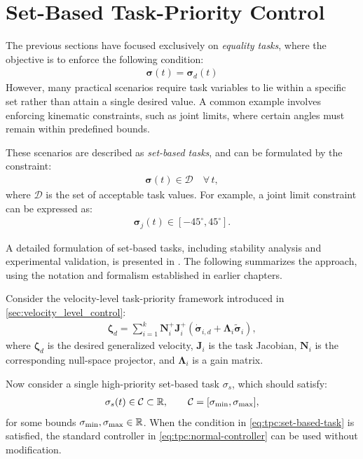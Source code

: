 \newpage
\section{Set-Based Task-Priority Control}
\label{sec:set_based_tpc}

The previous sections have focused exclusively on \emph{equality tasks}, where the objective is to enforce the following condition:
\begin{align}
    \bm{\sigma}(t) = \bm{\sigma}_d(t)
\end{align}
However, many practical scenarios require task variables to lie within a specific set rather than attain a single desired value. A common example involves enforcing kinematic constraints, such as joint limits, where certain angles must remain within predefined bounds.

These scenarios are described as \emph{set-based tasks}, and can be formulated by the constraint:
\begin{align}
    \bm{\sigma}(t) \in \mathcal{D} \quad \forall\, t,
\end{align}
where \(\mathcal{D}\) is the set of acceptable task values. For example, a joint limit constraint can be expressed as:
\begin{align}
    \bm{\sigma}_j(t) \in [-45^{\circ}, 45^{\circ}].
\end{align}

A detailed formulation of set-based tasks, including stability analysis and experimental validation, is presented in \cite{moe}. The following summarizes the approach, using the notation and formalism established in earlier chapters.

\vspace{1em}
\noindent Consider the velocity-level task-priority framework introduced in \autoref{sec:velocity_level_control}:
\begin{align}
    \bm{\zeta}_d = \sum_{i=1}^k \bm{N}_i^{+}\bm{J}_i^{+} \left(\dot{\bm{\sigma}}_{i,d} + \bm{\Lambda}_i \tilde{\bm{\sigma}}_i\right),
    \label{eq:tpc:normal-controller}
\end{align}
where \(\bm{\zeta}_d\) is the desired generalized velocity, \(\bm{J}_i\) is the task Jacobian, \(\bm{N}_i\) is the corresponding null-space projector, and \(\bm{\Lambda}_i\) is a gain matrix.

Now consider a single high-priority set-based task \(\sigma_s\), which should satisfy:
\begin{align}
    \sigma_s(t) \in \mathcal{C} \subset \mathbb{R}, \qquad \mathcal{C} = [\sigma_{\text{min}}, \sigma_{\text{max}}],
    \label{eq:tpc:set-based-task}
\end{align}
for some bounds \(\sigma_{\text{min}}, \sigma_{\text{max}} \in \mathbb{R}\). When the condition in \autoref{eq:tpc:set-based-task} is satisfied, the standard controller in \autoref{eq:tpc:normal-controller} can be used without modification.

